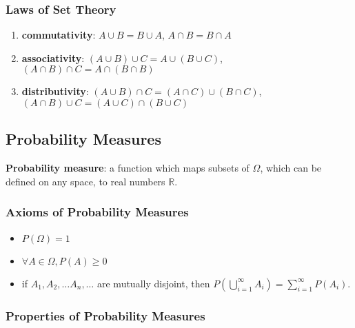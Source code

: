 \documentclass[a4paper,10pt]{article}
\newcommand{\R}{\mathbb{R}}
\begin{document}
\subsubsection{Laws of Set Theory} 

\begin{enumerate}
    \item \textbf{commutativity}: $A \cup B = B \cup A$, $A \cap B = B \cap A$
    \item \textbf{associativity}: $(A\cup B)\cup C = A\cup (B\cup C)$, $(A\cap B)\cap C = A\cap (B\cap B)$
    \item \textbf{distributivity}: $(A\cup B)\cap C = (A\cap C)\cup (B\cap C)$, $(A\cap B)\cup C = (A\cup C)\cap (B\cup C)$
\end{enumerate}

\subsection{Probability Measures}

\textbf{Probability measure}: a function which maps subsets of $\Omega$, which can be defined on any space, to real numbers $\R$.

\subsubsection{Axioms of Probability Measures}

\begin{itemize}
    \item $P(\Omega) = 1$
    \item $\forall A \in \Omega, P(A) \geq 0$
    \item if $A_1, A_2, \ldots A_n, \ldots$ are mutually disjoint, then $P(\bigcup_{i=1}^{\infty}A_i) = \sum_{i=1}^{\infty}P(A_i)$.
\end{itemize}

\subsubsection{Properties of Probability Measures}
\end{document}

